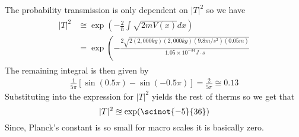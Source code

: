 \begin{ans}
	The probability transmission is only dependent on $ |T|^2 $ so we have 
	\begin{align*}
	\begin{aligned} | T | ^ { 2 } & \cong \exp \left( - \frac { 2 } { \hbar } \int \sqrt { 2 m V ( x ) } d x \right) \\ & = \exp \left( - \frac { 2 \sqrt { 2 ( 2,000 k g ) ( 2,000 k g ) \left( 9.8 m / s ^ { 2 } \right) ( 0.05 m ) } } { 1.05 \times 10 ^ { - 34 } J \cdot s } \right. \end{aligned}
	\end{align*}
	The remaining integral is then given by
	\begin{align*}
	\frac { 1 } { 5 \pi } [ \sin ( 0.5 \pi ) - \sin ( - 0.5 \pi ) ] = \frac { 2 } { 5 \pi } \cong 0.13
	\end{align*}
	Substituting into the expression for $ |T|^2 $ yields the rest of therms so we get that 
	\[ |T|^2 \approxeq \exp(\scinot{-5}{36}) \]
	Since, Planck's constant is so small for macro scales it is basically zero. 
\end{ans}

